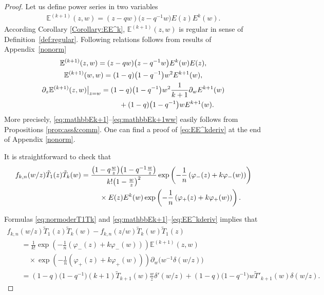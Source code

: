 \documentclass[pdftex]{sigma}
\numberwithin{equation}{section}
\theoremstyle{definition}
\newcommand{\T}{\tilde{T}}
\begin{document}
\begin{proof}
Let us define power series in two variables
\begin{gather*}
\mathbb{E}^{(k+1)} (z,w) = (z-qw)\big(z-q^{-1}w\big) E(z) E^{k}(w).
\end{gather*}
According Corollary \ref{Corollary:EE^k}, $\mathbb{E}^{(k+1)} (z,w)$ is regular in sense of Definition~\ref{def:regular}. Following relations follows from results of Appendix~\ref{nonorm}
\begin{gather}
\mathbb{E}^{(k+1)} (z,w) = (z-qw)\big(z-q^{-1}w\big) E^{k}(w) E(z), \label{eq:mathbbEk+1}\\
\mathbb{E}^{(k+1)} (w,w) = (1-q)\big(1-q^{-1}\big) w^2 E^{k+1} (w), \label{eq:mathbbEk+1ww}\\
 \mathbb \partial_z \mathbb{E}^{(k+1)} (z,w) \big|_{z=w} = (1-q)\big(1-q^{-1}\big) w^2 \frac{1}{k+1} \partial_w E^{k+1} (w)\nonumber\\
\hphantom{\mathbb \partial_z \mathbb{E}^{(k+1)} (z,w) \big|_{z=w} =}{} + (1-q)\big(1-q^{-1}\big) w E^{k+1}(w). \label{eq:EE^kderiv}
\end{gather}
More precisely, \eqref{eq:mathbbEk+1}--\eqref{eq:mathbbEk+1ww} easily follows from Propositions \ref{prop:ass&comm}. One can find a proof of \eqref{eq:EE^kderiv} at the end of Appendix \ref{nonorm}.

It is straightforward to check that
\begin{gather}
f_{k,n}(w/z) \T_{1}(z) \T_{k} (w) = \frac{ \big(1-q\frac{w}{z}\big) \big(1-q^{-1}\frac{w}{z}\big)}{k! \big(1-\frac{w}{z}\big)^{2}} \exp \left( - \frac{1}{n} \left( \varphi_-(z) + k \varphi_- (w) \right) \right)\nonumber\\
\hphantom{f_{k,n}(w/z) \T_{1}(z) \T_{k} (w) =}{}
\times E (z) E^k(w) \exp \left( - \frac{1}{n} \left( \varphi_+(z) + k \varphi_+ (w) \right) \right). \label{eq:normoderT1Tk}
\end{gather}

Formulas \eqref{eq:normoderT1Tk} and \eqref{eq:mathbbEk+1}--\eqref{eq:EE^kderiv} implies that
\begin{gather*}
f_{k,n}(w/z) \T_{1}(z) \T_{k} (w) - f_{k,n}(z/w) \T_k(w) \T_1 (z) \\
\qquad{} = \frac{1}{k!} \exp \left( - \frac{1}{n} \left( \varphi_-(z) + k \varphi_- (w) \right) \right) \mathbb{E}^{(k+1)}(z,w) \\
\qquad\quad{}\times \exp \left( - \frac{1}{n} \left( \varphi_+(z) + k \varphi_+ (w) \right) \right) \partial_w \big( w^{-1} \delta(w/z) \big) \\
\qquad {} = (1-q)\big(1-q^{-1}\big)(k+1) \T_{k+1}(w) \frac{w}{z} \delta'(w/z) + (1-q)\big(1-q^{-1}\big) w \T'_{k+1}(w) \delta(w/z).\!\!\!\tag*{\qed}
\end{gather*}
\renewcommand{\qed}{}
\end{proof}
\end{document}
